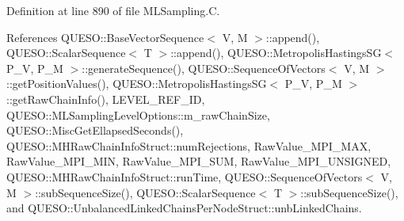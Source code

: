 Definition at line 890 of file M\-L\-Sampling.\-C.



References Q\-U\-E\-S\-O\-::\-Base\-Vector\-Sequence$<$ V, M $>$\-::append(), Q\-U\-E\-S\-O\-::\-Scalar\-Sequence$<$ T $>$\-::append(), Q\-U\-E\-S\-O\-::\-Metropolis\-Hastings\-S\-G$<$ P\-\_\-\-V, P\-\_\-\-M $>$\-::generate\-Sequence(), Q\-U\-E\-S\-O\-::\-Sequence\-Of\-Vectors$<$ V, M $>$\-::get\-Position\-Values(), Q\-U\-E\-S\-O\-::\-Metropolis\-Hastings\-S\-G$<$ P\-\_\-\-V, P\-\_\-\-M $>$\-::get\-Raw\-Chain\-Info(), L\-E\-V\-E\-L\-\_\-\-R\-E\-F\-\_\-\-I\-D, Q\-U\-E\-S\-O\-::\-M\-L\-Sampling\-Level\-Options\-::m\-\_\-raw\-Chain\-Size, Q\-U\-E\-S\-O\-::\-Misc\-Get\-Ellapsed\-Seconds(), Q\-U\-E\-S\-O\-::\-M\-H\-Raw\-Chain\-Info\-Struct\-::num\-Rejections, Raw\-Value\-\_\-\-M\-P\-I\-\_\-\-M\-A\-X, Raw\-Value\-\_\-\-M\-P\-I\-\_\-\-M\-I\-N, Raw\-Value\-\_\-\-M\-P\-I\-\_\-\-S\-U\-M, Raw\-Value\-\_\-\-M\-P\-I\-\_\-\-U\-N\-S\-I\-G\-N\-E\-D, Q\-U\-E\-S\-O\-::\-M\-H\-Raw\-Chain\-Info\-Struct\-::run\-Time, Q\-U\-E\-S\-O\-::\-Sequence\-Of\-Vectors$<$ V, M $>$\-::sub\-Sequence\-Size(), Q\-U\-E\-S\-O\-::\-Scalar\-Sequence$<$ T $>$\-::sub\-Sequence\-Size(), and Q\-U\-E\-S\-O\-::\-Unbalanced\-Linked\-Chains\-Per\-Node\-Struct\-::unb\-Linked\-Chains.



